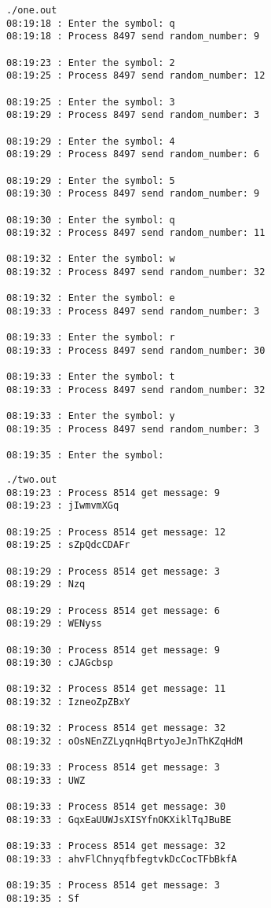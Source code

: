 \noindent\begin{minipage}{.47\textwidth}
    \begin{lstlisting}[name=Tetminal 1,]
./one.out
08:19:18 : Enter the symbol: q
08:19:18 : Process 8497 send random_number: 9

08:19:23 : Enter the symbol: 2
08:19:25 : Process 8497 send random_number: 12

08:19:25 : Enter the symbol: 3
08:19:29 : Process 8497 send random_number: 3

08:19:29 : Enter the symbol: 4
08:19:29 : Process 8497 send random_number: 6

08:19:29 : Enter the symbol: 5
08:19:30 : Process 8497 send random_number: 9

08:19:30 : Enter the symbol: q
08:19:32 : Process 8497 send random_number: 11

08:19:32 : Enter the symbol: w
08:19:32 : Process 8497 send random_number: 32

08:19:32 : Enter the symbol: e
08:19:33 : Process 8497 send random_number: 3

08:19:33 : Enter the symbol: r
08:19:33 : Process 8497 send random_number: 30

08:19:33 : Enter the symbol: t
08:19:33 : Process 8497 send random_number: 32

08:19:33 : Enter the symbol: y
08:19:35 : Process 8497 send random_number: 3

08:19:35 : Enter the symbol: 
    \end{lstlisting}
\end{minipage}
\hfill
\begin{minipage}{.47\textwidth}
    \begin{lstlisting}[name=Tetminal 2,]
./two.out
08:19:23 : Process 8514 get message: 9
08:19:23 : jIwmvmXGq

08:19:25 : Process 8514 get message: 12
08:19:25 : sZpQdcCDAFr

08:19:29 : Process 8514 get message: 3
08:19:29 : Nzq

08:19:29 : Process 8514 get message: 6
08:19:29 : WENyss

08:19:30 : Process 8514 get message: 9
08:19:30 : cJAGcbsp

08:19:32 : Process 8514 get message: 11
08:19:32 : IzneoZpZBxY

08:19:32 : Process 8514 get message: 32
08:19:32 : oOsNEnZZLyqnHqBrtyoJeJnThKZqHdM

08:19:33 : Process 8514 get message: 3
08:19:33 : UWZ

08:19:33 : Process 8514 get message: 30
08:19:33 : GqxEaUUWJsXISYfnOKXiklTqJBuBE

08:19:33 : Process 8514 get message: 32
08:19:33 : ahvFlChnyqfbfegtvkDcCocTFbBkfA

08:19:35 : Process 8514 get message: 3
08:19:35 : Sf


    \end{lstlisting}
\end{minipage}